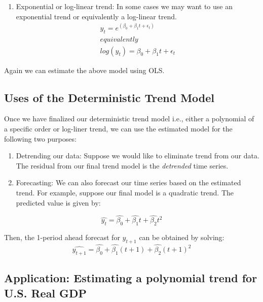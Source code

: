 \documentclass[]{book}
\providecommand{\tightlist}{%
  \setlength{\itemsep}{0pt}\setlength{\parskip}{0pt}}
\theoremstyle{definition}
\theoremstyle{definition}
\theoremstyle{definition}
\theoremstyle{remark}
\begin{document}
\begin{enumerate}
\def\labelenumi{\arabic{enumi}.}
\setcounter{enumi}{1}
\tightlist
\item
  Exponential or log-linear trend: In some cases we may want to use an exponential trend or equivalently a log-linear trend.
  \begin{align}
  y_t=e^{(\beta_0 +\beta_1 t +\epsilon_t)}\\
  equivalently\\
  log(y_t)=\beta_0 +\beta_1 t +\epsilon_t
  \end{align}
\end{enumerate}

Again we can estimate the above model using OLS.

\hypertarget{uses-of-the-deterministic-trend-model}{%
\subsection{Uses of the Deterministic Trend Model}\label{uses-of-the-deterministic-trend-model}}

Once we have finalized our deterministic trend model i.e., either a polynomial of a specific order or log-liner trend, we can use the estimated model for the following two purposes:

\begin{enumerate}
\def\labelenumi{\arabic{enumi}.}
\item
  Detrending our data: Suppose we would like to eliminate trend from our data. The residual from our final trend model is the \emph{detrended} time series.
\item
  Forecasting: We can also forecast our time series based on the estimated trend. For example, suppose our final model is a quadratic trend. The predicted value is given by:
\end{enumerate}

\begin{equation}
\widehat{y_t}=\widehat{\beta_0}+\widehat{\beta_1} t + \widehat{\beta_2} t^2
\end{equation}

Then, the 1-period ahead forecast for \(y_{t+1}\) can be obtained by solving:
\begin{equation}
\widehat{y_{t+1}}=\widehat{\beta_0}+\widehat{\beta_1} (t+1) + \widehat{\beta_2} (t+1)^2
\end{equation}

\hypertarget{application-estimating-a-polynomial-trend-for-u.s.-real-gdp}{%
\subsection{Application: Estimating a polynomial trend for U.S. Real GDP}\label{application-estimating-a-polynomial-trend-for-u.s.-real-gdp}}
\end{document}
